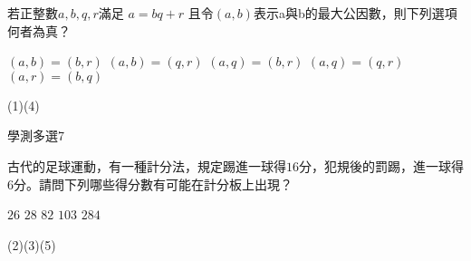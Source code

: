 \begin{QUESTIONS}
\begin{QUESTION}
\begin{ExamAnsRateInfo}{}{}{}{}
        \end{ExamAnsRateInfo}
        \begin{QBODY}
			若正整數$a,b,q,r$滿足
			$a=bq+r$
			且令$\left( a,b \right)$表示a與b的最大公因數，則下列選項何者為真？
			\begin{QOPS}
				\QOP $\left( a,b \right)=\left( b,r \right)$
				\QOP $\left( a,b \right)=\left( q,r \right)$
				\QOP $\left( a,q \right)=\left( b,r \right)$
				\QOP $\left( a,q \right)=\left( q,r \right)$
				\QOP $\left( a,r \right)=\left( b,q \right)$
			\end{QOPS}
        \end{QBODY}
        \begin{QFROMS}
        \end{QFROMS}
        \begin{QTAGS}\end{QTAGS}
        \begin{QANS}
            (1)(4)
        \end{QANS}
        \begin{QSOLLIST}
        \end{QSOLLIST}
        \begin{QEMPTYSPACE}
        \end{QEMPTYSPACE}
    \end{QUESTION}
    \begin{QUESTION}
        \begin{ExamInfo}{90}{學測}{多選}{7}
        \end{ExamInfo}
        \begin{ExamAnsRateInfo}{}{}{}{}
        \end{ExamAnsRateInfo}
        \begin{QBODY}
			古代的足球運動，有一種計分法，規定踢進一球得$16$分，犯規後的罰踢，進一球得$6$分。請問下列哪些得分數有可能在計分板上出現？
			\begin{QOPS}
				\QOP $26$
				\QOP $28$
				\QOP $82$
				\QOP $103$
				\QOP $284$
			\end{QOPS}
        \end{QBODY}
        \begin{QFROMS}
        \end{QFROMS}
        \begin{QTAGS}\end{QTAGS}
        \begin{QANS}
            (2)(3)(5)
        \end{QANS}
        \begin{QSOLLIST}
        \end{QSOLLIST}

\end{QUESTION}
\end{QUESTIONS}
